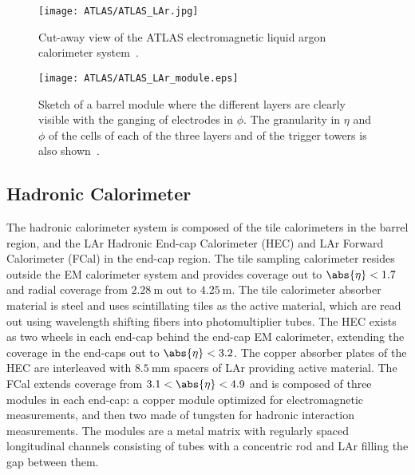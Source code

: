 \begin{figure}[htbp]
 \centering
 \texttt{[image: ATLAS/ATLAS\_LAr.jpg]}
 \caption[Cut-away view of the ATLAS electromagnetic liquid argon calorimeter system.]{%
  Cut-away view of the ATLAS electromagnetic liquid argon calorimeter system~\cite{Pequenao:1095927}.}\label{fig:ATLAS_LAr}
\end{figure}

\begin{figure}[htbp]
 \centering
 \texttt{[image: ATLAS/ATLAS\_LAr\_module.eps]}
 \caption[Sketch of a liquid argon calorimeter system barrel module detailing granularity in $\eta$ and $\phi$.]{%
  Sketch of a barrel module where the different layers are clearly visible with the ganging of electrodes in $\phi$.
  The granularity in $\eta$ and $\phi$ of the cells of each of the three layers and of the trigger towers is also shown~\cite{PERF-2007-01}.}\label{fig:ATLAS_LAr_module}
\end{figure}

\subsection{Hadronic Calorimeter}\label{sec:ATLAS_hadronic_calorimeter}

The hadronic calorimeter system is composed of the tile calorimeters in the barrel region, and the LAr Hadronic End-cap Calorimeter (HEC) and LAr Forward Calorimeter (FCal) in the end-cap region.
The tile sampling calorimeter resides outside the EM calorimeter system and provides coverage out to $\abs{\eta} < 1.7$ and radial coverage from $2.28~\mathrm{m}$ out to $4.25~\mathrm{m}$.
The tile calorimeter absorber material is steel and uses scintillating tiles as the active material, which are read out using wavelength shifting fibers into photomultiplier tubes.
The HEC exists as two wheels in each end-cap behind the end-cap EM calorimeter, extending the coverage in the end-caps out to $\abs{\eta} < 3.2$.
The copper absorber plates of the HEC are interleaved with $8.5~\mathrm{mm}$ spacers of LAr providing active material.
The FCal extends coverage from $3.1 < \abs{\eta} < 4.9$ and is composed of three modules in each end-cap: a copper module optimized for electromagnetic measurements, and then two made of tungsten for hadronic interaction measurements.
The modules are a metal matrix with regularly spaced longitudinal channels consisting of tubes with a concentric rod and LAr filling the gap between them.

